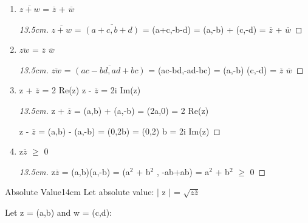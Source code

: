	\begin{enumerate}[label=(\alph*), leftmargin=2cm, itemsep=0.1cm]
		\item $\overline{z+w}$ = $\overline{z}$ + $\overline{w}$
		
			\begin{proof}[13.5cm]
				$\overline{z+w}$ = $\overline{(a+c,b+d)}$ = (a+c,-b-d)
				= (a,-b) + (c,-d) = $\overline{z}$ + $\overline{w}$
			\end{proof}

		\item $\overline{zw}$ = $\overline{z}$ $\overline{w}$
		
			\begin{proof}[13.5cm]
				$\overline{zw}$ = $\overline{(ac-bd,ad+bc)}$ = (ac-bd,-ad-bc)
				= (a,-b) (c,-d) = $\overline{z}$ $\overline{w}$
			\end{proof}

		\item z + $\overline{z}$ = 2 Re(z)
			\hspace{1cm} z - $\overline{z}$ = 2i Im(z)

			\begin{proof}[13.5cm]
				z + $\overline{z}$ = (a,b) + (a,-b) = (2a,0) = 2 Re(z)

				z - $\overline{z}$ = (a,b) - (a,-b) = (0,2b) = (0,2) b = 2i Im(z)
			\end{proof}

		\item z$\overline{z}$ $\geq$ 0

			\begin{proof}[13.5cm]
				z$\overline{z}$ = (a,b)(a,-b) = (a$^2$ + b$^2$ , -ab+ab)
				= a$^2$ + b$^2$ $\geq$ 0
			\end{proof}
	\end{enumerate}

	\vspace{0.5cm}



	\begin{definition}{Absolute Value}{14cm}
		Let absolute value: $|$ z $|$ = $\sqrt{z \overline{z}}$

		Let z = (a,b) and w = (c,d):
	\end{definition}
	
